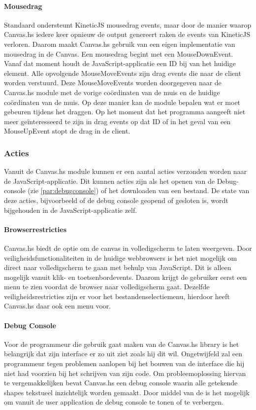 \paragraph{Mousedrag}
Standaard ondersteunt KineticJS mousedrag events, maar door de manier waarop Canvas.hs iedere keer opnieuw de output genereert raken de events van KineticJS verloren. Daarom maakt Canvas.hs gebruik van een eigen implementatie van mousedrag in de Canvas. Een mousedrag begint met een MouseDownEvent. Vanaf dat moment houdt de JavaScript-applicatie een ID bij van het huidige element. Alle opvolgende MouseMoveEvents zijn drag events die naar de client worden verstuurd. Deze MouseMoveEvents worden doorgegeven naar de Canvas.hs module met de vorige coördinaten van de muis en de huidige coördinaten van de muis.
Op deze manier kan de module bepalen wat er moet gebeuren tijdens het draggen. Op het moment dat het programma aangeeft niet meer ge\"interesseerd te zijn in drag events op dat ID of in het geval van een MouseUpEvent stopt de drag in de client.

\subsubsection{Acties}
Vanuit de Canvas.hs module kunnen er een aantal acties verzonden worden naar de JavaScript-applicatie. Dit kunnen acties zijn als het openen van de Debug-console (zie \autoref{par:debugconsole}) of het downloaden van een bestand. De state van deze acties, bijvoorbeeld of de debug console geopend of gesloten is, wordt bijgehouden in de JavaScript-applicatie zelf.

\paragraph{Browserrestricties}
Canvas.hs biedt de optie om de canvas in volledigscherm te laten weergeven. Door veiligheidsfunctionaliteiten in de huidige webbrowsers is het niet mogelijk om direct naar volledigscherm te gaan met behulp van JavaScript. Dit is alleen mogelijk vanuit klik- en toetsenbordevents. Daarom krijgt de gebruiker eerst een menu te zien voordat de browser naar volledigscherm gaat. Dezelfde veiligheidsrestricties zijn er voor het bestandenselectiemenu, hierdoor heeft Canvas.hs daar ook een menu voor.

\paragraph{Debug Console} \label{par:debugconsole}
Voor de programmeur die gebruik gaat maken van de Canvas.hs library is het belangrijk dat zijn interface er zo uit ziet zoals hij dit wil. Ongetwijfeld zal een programmeur tegen problemen aanlopen bij het bouwen van de interface die hij niet had voorzien bij het schrijven van zijn code. Om probleemoplossing hiervan te vergemakkelijken bevat Canvas.hs een debug console waarin alle getekende shapes tekstueel inzichtelijk worden gemaakt. Door middel van de  is het mogelijk om vanuit de user application de debug console te tonen of te verbergen.